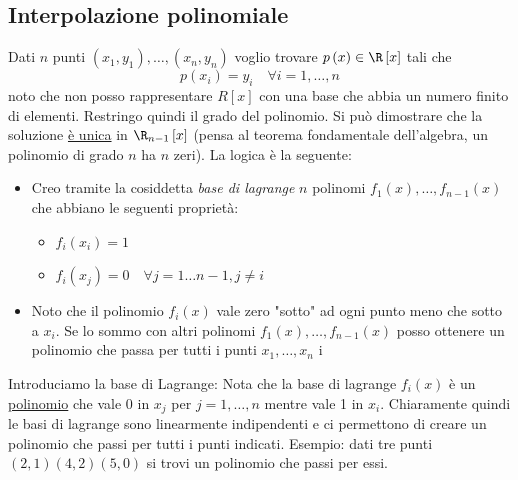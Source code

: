 \documentclass[12pt,a4paper,oneside]{article}
\begin{document}
\subsection{Interpolazione polinomiale}
Dati $ n $ punti $\left( x_1, y_1 \right) , \ldots, \left( x_n, y_n \right) $ voglio trovare $p\left( x \right) \in  \R\left[ x \right] $ tali che
\[
	p\left( x_i \right) = y_i \quad \forall i = 1,\ldots, n
\]
noto che non posso rappresentare $R\left[ x \right] $ con una base che abbia un numero finito di elementi. Restringo quindi il grado del polinomio. Si può dimostrare che la soluzione \underline{è unica} in $\R_{n-1}\left[ x \right] $ (pensa al teorema fondamentale dell'algebra, un polinomio di grado $n$ ha $n$ zeri).
\vskip3mm
La logica è la seguente:
\begin{itemize}
	\item Creo tramite la cosiddetta \textit{base di lagrange} $n$ polinomi $f_1\left( x \right),\ldots, f_{n - 1}\left( x \right) $ che abbiano le seguenti proprietà:
	      \begin{itemize}
		      \item $f_i\left( x_i \right) =1$
		      \item $f_i\left( x_j\right) = 0 \quad \forall j = 1\ldots n-1, j \neq i$
	      \end{itemize}
	\item Noto che il polinomio $f_i\left( x \right) $ vale zero "sotto" ad ogni punto meno che sotto a $x_i$. Se lo sommo con altri polinomi $f_1\left( x \right) ,\ldots, f_{n-1}\left( x \right) $ posso ottenere un polinomio che passa per tutti i punti $x_1,\ldots, x_{n}$
	      i
\end{itemize}
Introduciamo la base di Lagrange:
Nota che la base di lagrange $f_i\left( x \right) $ è un \underline{polinomio} che vale 0 in $x_j$ per $j=1,\ldots,n$ mentre vale 1 in $x_i$. Chiaramente quindi le basi di lagrange sono linearmente indipendenti e ci permettono di creare un polinomio che passi per tutti i punti indicati.
\vskip3mm
Esempio: dati tre punti $\left( 2,1 \right)  \left( 4,2 \right)  \left( 5,0 \right) $ si trovi un polinomio che passi per essi.
\end{document}
